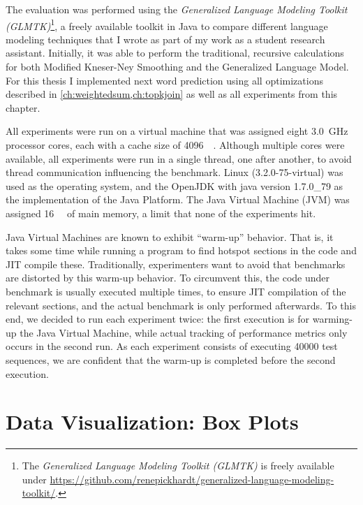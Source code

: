 The evaluation was performed using the \emph{Generalized Language Modeling
Toolkit (GLMTK)}\footnote{The \emph{Generalized Language Modeling Toolkit
(GLMTK)} is freely available under
\mbox{\url{https://github.com/renepickhardt/generalized-language-modeling-toolkit/}}.},
a freely available toolkit in Java to compare different language modeling
techniques that I wrote as part of my work as a student research assistant.
Initially, it was able to perform the traditional, recursive calculations for
both Modified Kneser-Ney Smoothing and the Generalized Language Model.
For this thesis I implemented next word prediction using all optimizations
described in \cref{ch:weightedsum,ch:topkjoin} as well as all experiments from
this chapter.

All experiments were run on a virtual machine that was assigned eight
\SI{3.0}{\giga\hertz} processor cores, each with a cache size of
\SI{4096}{\kibi\byte}.
Although multiple cores were available, all experiments were run in a single
thread, one after another, to avoid thread communication influencing the
benchmark.
Linux (3.2.0-75-virtual) was used as the operating system, and
the OpenJDK with java version 1.7.0\_79 as the implementation of the
Java Platform.
The Java Virtual Machine (JVM) was assigned \SI{16}{\gibi\byte} of main memory,
a limit that none of the experiments hit.

Java Virtual Machines are known to exhibit \enquote{warm-up} behavior\noref.
That is, it takes some time while running a program to find hotspot sections
in the code and JIT compile these.
Traditionally, experimenters want to avoid that benchmarks are distorted by
this warm-up behavior\noref.
To circumvent this, the code under benchmark is usually executed multiple times,
to ensure JIT compilation of the relevant sections, and the actual benchmark
is only performed afterwards.
To this end, we decided to run each experiment twice:
the first execution is for warming-up the Java Virtual Machine, while actual
tracking of performance metrics only occurs in the second run.
As each experiment consists of executing \num{40000} test sequences, we are
confident that the warm-up is completed before the second execution.


\section{Data Visualization: Box Plots}
\label{sec:boxplot}

